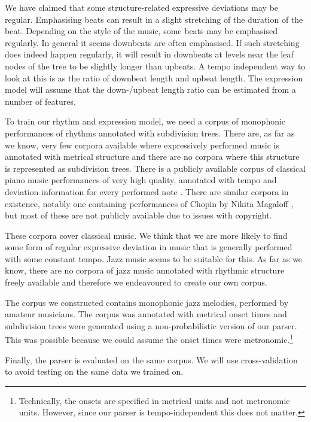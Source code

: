 We have claimed that some structure-related expressive deviations may be regular. Emphasising beats can result in a slight stretching of the duration of the beat. Depending on the style of the music, some beats may be emphasised regularly. In general it seems downbeats are often emphasised. If such stretching does indeed happen regularly, it will result in downbeats at levels near the leaf nodes of the tree to be slightly longer than upbeats. A tempo independent way to look at this is as the ratio of downbeat length and upbeat length. The expression model will assume that the down-/upbeat length ratio can be estimated from a number of features.

To train our rhythm and expression model, we need a corpus of monophonic performances of rhythms annotated with subdivision trees. There are, as far as we know, very few corpora available where expressively performed music is annotated with metrical structure and there are no corpora where this structure is represented as subdivision trees. There is a publicly available corpus of classical piano music performances of very high quality, annotated with tempo and deviation information for every performed note \citep{hashida2008new}. There are similar corpora in existence, notably one containing performances of Chopin by Nikita Magaloff \citep{flossmann2010magaloff}, but most of these are not publicly available due to issues with copyright. 

These corpora cover classical music. We think that we are more likely to find some form of regular expressive deviation in music that is generally performed with some constant tempo. Jazz music seems to be suitable for this. As far as we know, there are no corpora of jazz music annotated with rhythmic structure freely available and therefore we endeavoured to create our own corpus.

The corpus we constructed contains monophonic jazz melodies, performed by amateur musicians. The corpus was annotated with metrical onset times and subdivision trees were generated using a non-probabilistic version of our parser. This was possible because we could assume the onset times were metronomic.\footnote{Technically, the onsets are specified in metrical units and not metronomic units. However, since our parser is tempo-independent this does not matter.}

Finally, the parser is evaluated on the same corpus. We will use cross-validation to avoid testing on the same data we trained on.
